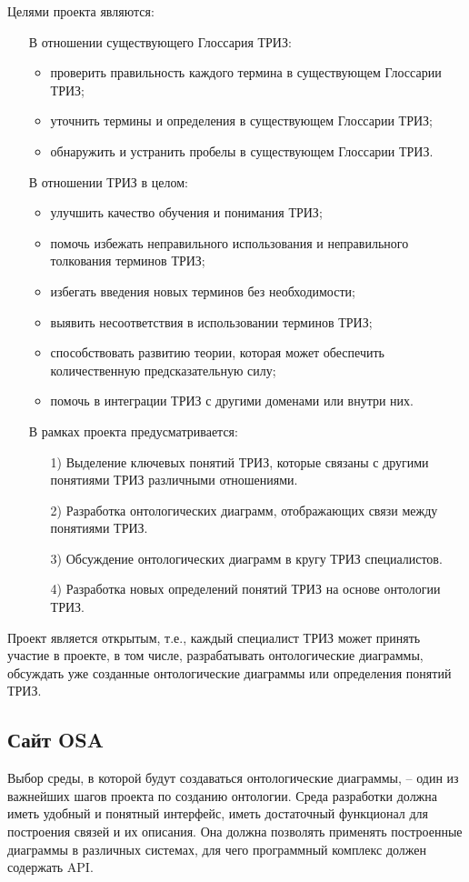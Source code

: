 \documentclass[11pt,a4paper]{article}
\begin{document}
Целями проекта являются:
\begin{itemize}
\item[] В отношении существующего Глоссария ТРИЗ:
  \begin{itemize}[noitemsep]
  \item проверить правильность каждого термина в существующем Глоссарии ТРИЗ;
  \item уточнить термины и определения в существующем Глоссарии ТРИЗ;
  \item обнаружить и устранить пробелы в существующем Глоссарии ТРИЗ.
  \end{itemize}
\item[]   В отношении ТРИЗ в целом:
  \begin{itemize}[noitemsep]
  \item улучшить качество обучения и понимания ТРИЗ;
  \item помочь избежать неправильного использования и неправильного толкования
    терминов ТРИЗ;
  \item избегать введения новых терминов без необходимости;
  \item выявить несоответствия в использовании терминов ТРИЗ;
  \item способствовать развитию теории, которая может обеспечить
    количественную предсказательную силу;
  \item помочь в интеграции ТРИЗ с другими доменами или внутри них.
  \end{itemize}
\item[] В рамках проекта предусматривается:
  \begin{itemize}[noitemsep]
  \item[1)] Выделение ключевых понятий ТРИЗ, которые связаны с другими
    понятиями ТРИЗ различными отношениями.
  \item[2)] Разработка онтологических диаграмм, отображающих связи между
    понятиями ТРИЗ.
  \item[3)] Обсуждение онтологических диаграмм в кругу ТРИЗ специалистов.
  \item[4)] Разработка новых определений понятий ТРИЗ на основе онтологии
    ТРИЗ. 
  \end{itemize}
\end{itemize}
Проект является открытым, т.е., каждый специалист ТРИЗ может принять участие в
проекте, в том числе, разрабатывать онтологические диаграммы, обсуждать уже
созданные онтологические диаграммы или определения понятий ТРИЗ.

\subsection{Сайт OSA}
Выбор среды, в которой будут создаваться онтологические диаграммы, -- один из
важнейших шагов проекта по созданию онтологии. Среда разработки должна иметь
удобный и понятный интерфейс, иметь достаточный функционал для построения
связей и их описания. Она должна позволять применять построенные диаграммы в
различных системах, для чего программный комплекс должен содержать API.
\end{document}
